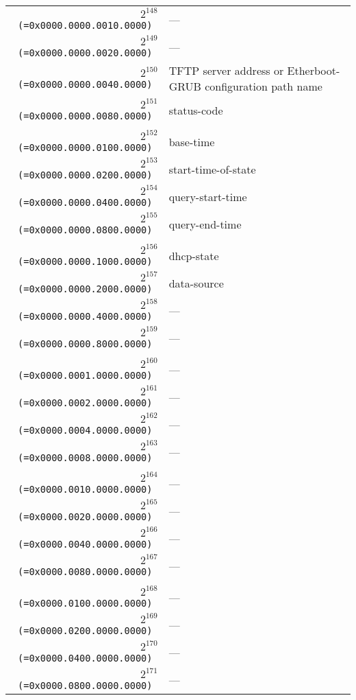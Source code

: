 \documentclass[documentation]{subfiles}
\begin{document}
\begin{small}
\begin{longtable}{>{\tt}rl}
        \\
        $2^{148}$ (=0x0000.0000.0010.0000) & --- \\
        $2^{149}$ (=0x0000.0000.0020.0000) & --- \\
        $2^{150}$ (=0x0000.0000.0040.0000) & TFTP server address or Etherboot-GRUB configuration path name \\
        $2^{151}$ (=0x0000.0000.0080.0000) & status-code \\
        \\
        $2^{152}$ (=0x0000.0000.0100.0000) & base-time \\
        $2^{153}$ (=0x0000.0000.0200.0000) & start-time-of-state \\
        $2^{154}$ (=0x0000.0000.0400.0000) & query-start-time \\
        $2^{155}$ (=0x0000.0000.0800.0000) & query-end-time \\
        \\
        $2^{156}$ (=0x0000.0000.1000.0000) & dhcp-state \\
        $2^{157}$ (=0x0000.0000.2000.0000) & data-source \\
        $2^{158}$ (=0x0000.0000.4000.0000) & --- \\
        $2^{159}$ (=0x0000.0000.8000.0000) & --- \\
        \\
        $2^{160}$ (=0x0000.0001.0000.0000) & --- \\
        $2^{161}$ (=0x0000.0002.0000.0000) & --- \\
        $2^{162}$ (=0x0000.0004.0000.0000) & --- \\
        $2^{163}$ (=0x0000.0008.0000.0000) & --- \\
        \\
        $2^{164}$ (=0x0000.0010.0000.0000) & --- \\
        $2^{165}$ (=0x0000.0020.0000.0000) & --- \\
        $2^{166}$ (=0x0000.0040.0000.0000) & --- \\
        $2^{167}$ (=0x0000.0080.0000.0000) & --- \\
        \\
        $2^{168}$ (=0x0000.0100.0000.0000) & --- \\
        $2^{169}$ (=0x0000.0200.0000.0000) & --- \\
        $2^{170}$ (=0x0000.0400.0000.0000) & --- \\
        $2^{171}$ (=0x0000.0800.0000.0000) & --- \\

\end{longtable}
\end{small}
\end{document}
